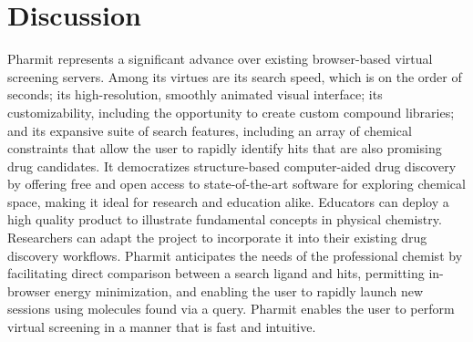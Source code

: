 \section{Discussion}
Pharmit represents a significant advance over existing browser-based virtual screening servers. Among its virtues are its search speed, which is on the order of seconds; its high-resolution, smoothly animated visual interface; its customizability, including the opportunity to create custom compound libraries; and its expansive suite of search features, including an array of chemical constraints that allow the user to rapidly identify hits that are also promising drug candidates. It democratizes structure-based computer-aided drug discovery by offering free and open access to state-of-the-art software for exploring chemical space, making it ideal for research and education alike. Educators can deploy a high quality product to illustrate fundamental concepts in physical chemistry. Researchers can adapt the project to incorporate it into their existing drug discovery workflows. Pharmit anticipates the needs of the professional chemist by facilitating direct comparison between a search ligand and hits, permitting in-browser energy minimization, and enabling the user to rapidly launch new sessions using molecules found via a query. Pharmit enables the user to perform virtual screening in a manner that is fast and intuitive. 


